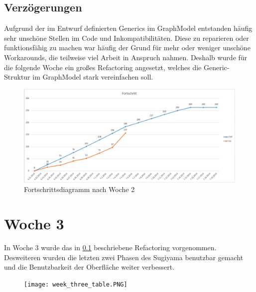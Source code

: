 \subsection{Verzögerungen}
\label{sec:delay_week2}
Aufgrund der im Entwurf definierten Generics im GraphModel entstanden häufig sehr unschöne Stellen im Code und Inkompatibilitäten. Diese zu reparieren oder funktionsfähig zu machen war häufig der Grund für mehr oder weniger unschöne Workarounds, die teilweise viel Arbeit in Anspruch nahmen. Deshalb wurde für die folgende Woche ein großes Refactoring angesetzt, welches die Generic-Struktur im GraphModel stark vereinfachen soll.

\begin{figure}[!htbp]
	\centering
	\includegraphics[width=380pt]{resourcen/week_two_diagram.PNG}
	\caption{Fortschrittsdiagramm nach Woche 2}
	\label{fig:week_two_diagram}
\end{figure}

\section{Woche 3}
In Woche 3 wurde das in \ref{sec:delay_week2} beschriebene Refactoring vorgenommen. Desweiteren wurden die letzten zwei Phasen des Sugiyama benutzbar gemacht und die Benutzbarkeit der Oberfläche weiter verbessert.
\begin{figure}[!htbp]
	\centering
	\texttt{[image: week\_three\_table.PNG]}
	\caption{}
	\label{fig:week_three_table}
\end{figure}
